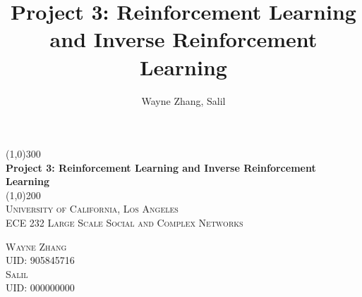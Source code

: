 \documentclass{article}
\title{Project 3: Reinforcement Learning and Inverse Reinforcement Learning}
\author{Wayne Zhang, Salil}
\begin{document}
\begin{titlepage}
    \begin{center}
        \line(1,0){300}\\
        [5mm]
        \huge{\bfseries Project 3: Reinforcement Learning and Inverse Reinforcement Learning}\\
        [1mm]
        \line(1,0){200}\\
        [15mm]
        \textsc{\LARGE University of California, Los Angeles}\\
        [7mm]
        \textsc{\Large ECE 232 Large Scale Social and Complex Networks}\\
        [10cm]
    \end{center}
    \begin{flushright}
        \textsc{\large Wayne Zhang\\
        UID: 905845716}\\
        [2mm]
        \textsc{\large Salil\\
        UID: 000000000}
    \end{flushright}
\end{titlepage}

\tableofcontents
\thispagestyle{empty}
\clearpage

\listoffigures
\thispagestyle{empty}
\clearpage

\setcounter{page}{1}


\end{document}
